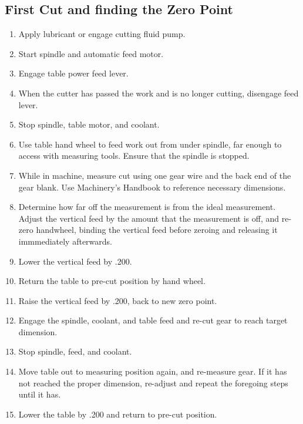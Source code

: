 \documentclass[12pt,twoside,letterpaper]{article}
\begin{document}
\subsection{First Cut and finding the Zero Point}
\begin{enumerate}
\item Apply lubricant or engage cutting fluid pump.
\item Start spindle and automatic feed motor.
\item Engage table power feed lever.
\item When the cutter has passed the work and is no longer cutting, disengage feed lever.
\item Stop spindle, table motor, and coolant.
\item Use table hand wheel to feed work out from under spindle, far enough to access with measuring tools. Ensure that the spindle is stopped.
\item While in machine, measure cut using one gear wire and the back end of the gear blank. Use Machinery's Handbook to reference necessary dimensions.
\item Determine how far off the measurement is from the ideal measurement. Adjust the vertical feed by the amount that the measurement is off, and re-zero handwheel, binding the vertical feed before zeroing and releasing it immmediately afterwards.

\item Lower the vertical feed by .200.
\item Return the table to pre-cut position by hand wheel.
\item Raise the vertical feed by .200, back to new zero point.

\item Engage the spindle, coolant, and table feed and re-cut gear to reach target dimension.
\item Stop spindle, feed, and coolant.
\item Move table out to measuring position again, and re-measure gear. If it has not reached the proper dimension, re-adjust and repeat the foregoing steps until it has.

\item Lower the table by .200 and return to pre-cut position.
\end{enumerate}
\end{document}
